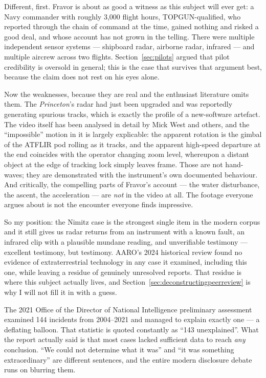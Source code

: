 Different, first. Fravor is about as good a witness as this subject will ever get: a Navy commander
with roughly 3,000 flight hours, TOPGUN-qualified, who reported through the chain of command at the
time, gained nothing and risked a good deal, and whose account has not grown in the telling. There
were multiple independent sensor systems --- shipboard radar, airborne radar, infrared --- and
multiple aircrew across two flights. Section~\ref{sec:pilots} argued that pilot credibility is
oversold in general; this is the case that survives that argument best, because the claim does not
rest on his eyes alone.

Now the weaknesses, because they are real and the enthusiast literature omits them. The
\emph{Princeton}'s radar had just been upgraded and was reportedly generating spurious tracks, which
is exactly the profile of a new-software artefact. The video itself has been analysed in detail by
Mick West and others, and the ``impossible'' motion in it is largely explicable: the apparent
rotation is the gimbal of the ATFLIR pod rolling as it tracks, and the apparent high-speed departure
at the end coincides with the operator changing zoom level, whereupon a distant object at the edge of
tracking lock simply leaves frame. Those are not hand-waves; they are demonstrated with the
instrument's own documented behaviour. And critically, the compelling parts of Fravor's account ---
the water disturbance, the ascent, the acceleration --- are \emph{not} in the video at all. The
footage everyone argues about is not the encounter everyone finds impressive.

So my position: the Nimitz case is the strongest single item in the modern corpus and it still gives
us radar returns from an instrument with a known fault, an infrared clip with a plausible mundane
reading, and unverifiable testimony --- excellent testimony, but testimony. AARO's 2024 historical
review found no evidence of extraterrestrial technology in any case it examined, including this one,
while leaving a residue of genuinely unresolved reports. That residue is where this subject actually
lives, and Section~\ref{sec:deconstructingpeerreview} is why I will not fill it in with a guess.

\begin{funfact}
The 2021 Office of the Director of National Intelligence preliminary assessment examined 144
incidents from 2004--2021 and managed to explain exactly one --- a deflating balloon. That statistic
is quoted constantly as ``143 unexplained''. What the report actually said is that most cases lacked
sufficient data to reach \emph{any} conclusion. ``We could not determine what it was'' and ``it was
something extraordinary'' are different sentences, and the entire modern disclosure debate runs on
blurring them.
\end{funfact}

